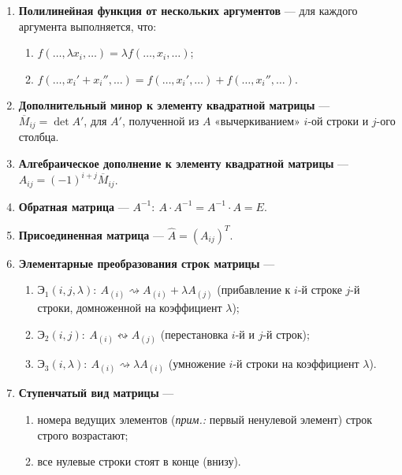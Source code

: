 \documentclass[a4paper, 12pt]{article}
\begin{document}
\begin{enumerate}
\item \textbf{Полилинейная функция от нескольких аргументов} — для каждого аргумента выполняется, что:
\begin{enumerate}
\item $f(\ldots, \lambda x_i, \dots) = \lambda f(\dots, x_i, \dots)$;
\item $f(\ldots, x_i' + x_i'', \dots) = f(\dots, x_i', \dots) + f(\dots, x_i'', \dots)$.
\end{enumerate}

\item \textbf{Дополнительный минор к элементу квадратной матрицы} --- $\overline{M}_{ij} = \det{A'}$, для $A'$, полученной из $A$ «вычеркиванием» $i$-ой строки и $j$-ого столбца.

\item \textbf{Алгебраическое дополнение к элементу квадратной матрицы} --- \\$A_{ij} = (-1)^{i+j} \overline{M}_{ij}$.

\item \textbf{Обратная матрица} — $A^{-1}:\ A\cdot A^{-1} = A^{-1} \cdot A = E$.

\item \textbf{Присоединенная матрица} — $\hat{A} = (A_{ij})^T$.

\item \textbf{Элементарные преобразования строк матрицы} — 
\begin{enumerate}
\item $\text{Э}_1(i, j, \lambda):\ A_{(i)} \rightsquigarrow A_{(i)} + \lambda A_{(j)}$ (прибавление к $i$-й строке $j$-й строки, домноженной на коэффициент $\lambda$);

\item $\text{Э}_2(i, j):\ A_{(i)} \leftrightsquigarrow A_{(j)}$ (перестановка $i$-й и $j$-й строк);

\item $\text{Э}_3(i, \lambda):\ A_{(i)} \rightsquigarrow \lambda A_{(i)}$ (умножение $i$-й строки на коэффициент $\lambda$).
\end{enumerate}

\item \textbf{Ступенчатый вид матрицы} — 
\begin{enumerate}
\item номера ведущих элементов (\textit{прим.:} первый ненулевой элемент) строк строго возрастают;

\item все нулевые строки стоят в конце (внизу).
\end{enumerate}


\end{enumerate}
\end{document}

